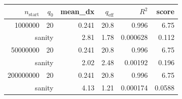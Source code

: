 \begin{tabular}{r r r r r r}
\hline
$n_{\mathrm{start}}$ & $q_0$ & mean\_dx & $q_{\mathrm{eff}}$ & $R^2$ & score \\
\hline
1000000 & 20 & 0.241 & 20.8 & 0.996 & 6.75 \\
\multicolumn{2}{r}{sanity} & 2.81 & 1.78 & 0.000628 & 0.112 \\
\hline
50000000 & 20 & 0.241 & 20.8 & 0.996 & 6.75 \\
\multicolumn{2}{r}{sanity} & 2.02 & 2.48 & 0.00192 & 0.196 \\
\hline
200000000 & 20 & 0.241 & 20.8 & 0.996 & 6.75 \\
\multicolumn{2}{r}{sanity} & 4.13 & 1.21 & 0.000174 & 0.0588 \\
\hline
\end{tabular}
